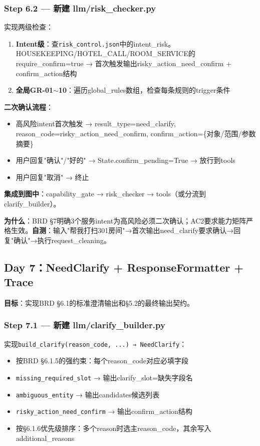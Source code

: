 \documentclass[12pt,a4paper]{ctexart}
\begin{document}
\subsubsection*{Step 6.2 — 新建 llm/risk\_checker.py}

实现两级检查：

\begin{enumerate}
    \item \textbf{Intent级}：查\texttt{risk\_control.json}中的intent\_risk。HOUSEKEEPING/HOTEL\_CALL/ROOM\_SERVICE的require\_confirm=true → 首次触发输出risky\_action\_need\_confirm + confirm\_action结构
    \item \textbf{全局GR-01$\sim$10}：遍历global\_rules数组，检查每条规则的trigger条件
\end{enumerate}

\textbf{二次确认流程}：
\begin{itemize}
    \item 高风险intent首次触发 → result\_type=need\_clarify, reason\_code=risky\_action\_need\_confirm, confirm\_action=\{对象/范围/参数摘要\}
    \item 用户回复"确认"/"好的" → State.confirm\_pending=True → 放行到tools
    \item 用户回复"取消" → 终止
\end{itemize}

\textbf{集成到图中}：capability\_gate → risk\_checker → tools（或分流到clarify\_builder）。

\textbf{为什么}：BRD §7明确3个服务intent为高风险必须二次确认；AC2要求能力矩阵严格生效。\textbf{自测}：输入"帮我打扫301房间"→首次输出need\_clarify要求确认→回复"确认"→执行request\_cleaning。

\newpage

\subsection{Day 7：NeedClarify + ResponseFormatter + Trace}

\textbf{目标}：实现BRD §6.1的标准澄清输出和§5.2的最终输出契约。

\subsubsection*{Step 7.1 — 新建 llm/clarify\_builder.py}

实现\texttt{build\_clarify(reason\_code, ...) → NeedClarify}：

\begin{itemize}
    \item 按BRD §6.1.5的强约束：每个reason\_code对应必填字段
    \item \texttt{missing\_required\_slot} → 输出clarify\_slot=缺失字段名
    \item \texttt{ambiguous\_entity} → 输出candidates候选列表
    \item \texttt{risky\_action\_need\_confirm} → 输出confirm\_action结构
    \item 按§6.1.6优先级排序：多个reason时选主reason\_code，其余写入additional\_reasons
\end{itemize}
\end{document}
